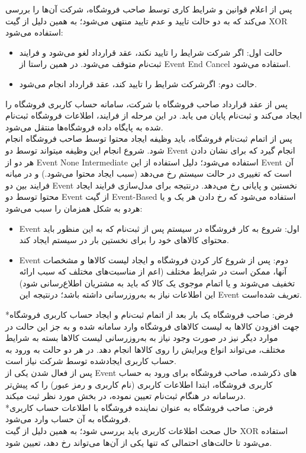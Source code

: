 \documentclass[14pt]{article}
\begin{document}
پس از اعلام قوانین و شرایط کاری توسط صاحب فروشگاه، شرکت آن‌ها را بررسی می‌کند که به دو حالت تایید و عدم تایید منتهی می‌شود؛ به همین دلیل از گیت XOR استفاده می‌شود:
\begin{flushright}
\begin{itemize}
\item حالت اول: اگر شرکت شرایط را تایید نکند، عقد قرارداد لغو می‌شود و فرایند ثبت‌نام متوقف می‌شود. در همین راستا از Event End Cancel استفاده می‌شود.
\item حالت دوم: اگرشرکت شرایط را تایید کند، عقد قرارداد انجام می‌شود.
\end{itemize}
\end{flushright}

پس از عقد قرارداد صاحب فروشگاه با شرکت، سامانه حساب کاربری فروشگاه را ایجاد می‌کند و ثبت‌نام پایان می یابد. در این مرحله از فرایند، اطلاعات فروشگاه ثبت‌نام شده به پایگاه داده فروشگاه‌ها منتقل می‌شود. \\
پس از اتمام ثبت‌نام فروشگاه، باید وظیفه ایجاد محتوا توسط صاحب فروشگاه انجام شود. شروع انجام این وظیفه میتواند توسط دو Event انجام گیرد که برای نشان دادن هر دو از 
Event None Intermediate استفاده می‌شود؛ دلیل استفاده از این Event آن است که تغییری در حالت سیستم رخ می‌دهد (سبب ایجاد محتوا می‌شود.) و در میانه فرایند بین دو Event نخستین و پایانی رخ می‌دهد. درنتیجه برای مدل‌سازی فرایند ایجاد محتوا توسط دو Event از گیت Event-Based استفاده می‌شود که رخ دادن هر یک و یا هردو به شکل همزمان را سبب می‌شود:

\begin{flushright}
\begin{itemize}
\item Event اول: شروع به کار فروشگاه در سیستم پس از ثبت‌نام که به این منظور باید محتوای کالاهای خود را برای نخستین بار در سیستم ایجاد کند.
\item Event دوم: پس از شروع کار کردن فروشگاه و ایجاد لیست کالا‌ها و مشخصات آنها، ممکن است در شرایط مختلف (اعم از مناسبت‌های مختلف که سبب ارائه تخفیف می‌شوند و یا اتمام موجوی یک کالا که باید به مشتریان اطلاع‌رسانی شود) این اطلاعات نیاز به به‌روزرسانی داشته باشد؛ درنتیجه این Event تعریف شده‌است.
\end{itemize}
\end{flushright}

*فرض:‌ صاحب فروشگاه یک بار بعد از اتمام ثبت‌نام و ایجاد حساب کاربری فروشگاه جهت افزودن کالاها به لیست کالاهای فروشگاه وارد سامانه شده و به جز این حالت در موارد دیگر نیز در صورت وجود نیاز به به‌روزرسانی لیست کالاها بسته به شرایط مختلف، می‌تواند انواع ویرایش را روی کالاها انجام دهد. در هر دو حالت به ورود به حساب کاربری ایجادشده توسط شرکت نیاز است.\\
پس از فعال شدن یکی از Event‌ های ذکرشده، صاحب فروشگاه برای ورود به حساب کاربری فروشگاه، ابتدا اطلاعات کاربری (نام کاربری و رمز عبور) را که پیش‌تر درسامانه در هنگام ثبت‌نام تعیین نموده، در بخش مورد نظر ثبت میکند. \\
*فرض: صاحب فروشگاه به عنوان نماینده فروشگاه با اطلاعات حساب کاربری فروشگاه به آن حساب وارد می‌شود.\\
حال صحت اطلاعات کاربری باید بررسی شود؛ به همین دلیل از گیت XOR  استفاده می‌شود تا حالت‌های احتمالی که تنها یکی از آن‌ها می‌تواند رخ دهد، تعیین شود.
\end{document}
